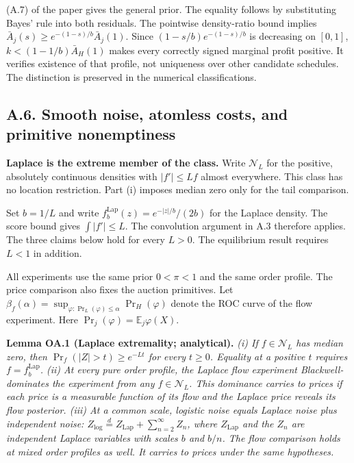 \documentclass[
  11pt,
]{article}
\newcounter{none} %
\begin{document}
(A.7) of the paper gives the general prior. The equality follows by
substituting Bayes' rule into both residuals. The pointwise
density-ratio bound implies \(\bar A_j(s)\ge e^{-(1-s)/b}\bar A_j(1)\).
Since \((1-s/b)e^{-(1-s)/b}\) is decreasing on \([0,1]\),
\(k<(1-1/b)\bar A_H(1)\) makes every correctly signed
marginal profit positive. It verifies existence of that profile, not
uniqueness over other candidate schedules. The distinction is preserved
in the numerical classifications.

\subsection{A.6. Smooth noise, atomless costs, and primitive
nonemptiness}\label{oa-a-extensions}

\protect{}\label{oa-a-laplace-extreme}
\noindent\textbf{Laplace is the extreme member of the class.}
Write \(\mathcal N_L\) for the positive, absolutely continuous densities
with \(|f'|\le Lf\) almost everywhere.
This class has no location restriction.
Part (i) imposes median zero only for the tail comparison.
\par
Set \(b=1/L\) and write \(f^{\mathrm{Lap}}_b(z)=e^{-|z|/b}/(2b)\) for the Laplace density.
The score bound gives \(\int|f'|\le L\).
The convolution argument in A.3 therefore applies.
The three claims below hold for every \(L>0\).
The equilibrium result requires \(L<1\) in addition.
\par
All experiments use the same prior \(0<\pi<1\) and the same order profile.
The price comparison also fixes the auction primitives.
Let \(\beta_f(\alpha)=\sup_{\varphi:\Pr_L(\varphi)\le\alpha}\Pr_H(\varphi)\)
denote the ROC curve of the flow experiment.
Here \(\Pr_j(\varphi)=\mathbb E_j\varphi(X)\).


\protect{}\label{result-lemma-oa-laplace-extreme}{\textbf{Lemma
OA.1 (Laplace extremality; analytical).}} \emph{(i) If \(f\in\mathcal N_L\)
has median zero, then \(\Pr_f(|Z|>t)\ge e^{-Lt}\) for every \(t\ge0\).
Equality at a positive \(t\) requires \(f=f^{\mathrm{Lap}}_b\).
(ii) At every pure order profile, the Laplace flow experiment Blackwell-dominates the experiment from any \(f\in\mathcal N_L\).
This dominance carries to prices if each price is a measurable function of its flow and the Laplace price reveals its flow posterior.
(iii) At a common scale, logistic noise equals Laplace noise plus independent noise:
\(Z_{\mathrm{log}}\overset d=Z_{\mathrm{Lap}}+\sum_{n=2}^{\infty}Z_n\), where
\(Z_{\mathrm{Lap}}\) and the \(Z_n\) are independent Laplace variables with scales \(b\) and \(b/n\).
The flow comparison holds at mixed order profiles as well.
It carries to prices under the same hypotheses.}
\end{document}
